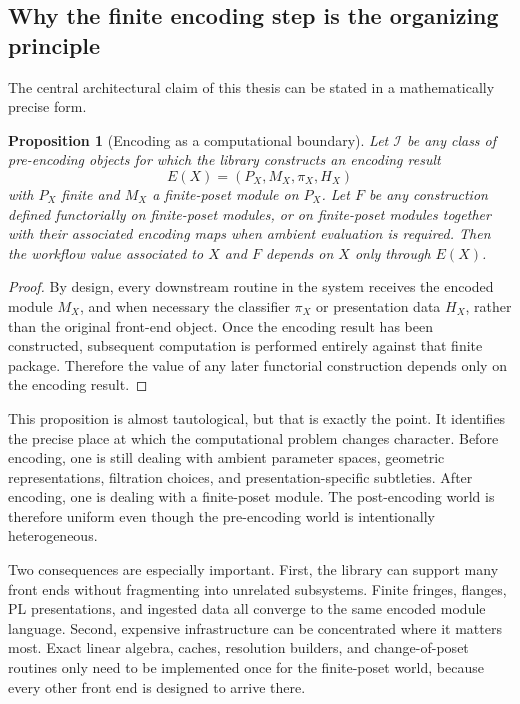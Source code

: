 \documentclass[11pt]{article}
\newtheorem{proposition}[theorem]{Proposition}
\theoremstyle{definition}
\theoremstyle{remark}
\begin{document}
\subsection{Why the finite encoding step is the organizing principle}

The central architectural claim of this thesis can be stated in a mathematically precise form.

\begin{proposition}[Encoding as a computational boundary]
Let $\mathcal{I}$ be any class of pre-encoding objects for which the library constructs an encoding result
\[
E(X)=(P_X,M_X,\pi_X,H_X)
\]
with $P_X$ finite and $M_X$ a finite-poset module on $P_X$.  Let $F$ be any construction defined functorially on finite-poset modules, or on finite-poset modules together with their associated encoding maps when ambient evaluation is required.  Then the workflow value associated to $X$ and $F$ depends on $X$ only through $E(X)$.
\end{proposition}

\begin{proof}
By design, every downstream routine in the system receives the encoded module $M_X$, and when necessary the classifier $\pi_X$ or presentation data $H_X$, rather than the original front-end object.  Once the encoding result has been constructed, subsequent computation is performed entirely against that finite package.  Therefore the value of any later functorial construction depends only on the encoding result.
\end{proof}

This proposition is almost tautological, but that is exactly the point.  It identifies the precise place at which the computational problem changes character.  Before encoding, one is still dealing with ambient parameter spaces, geometric representations, filtration choices, and presentation-specific subtleties.  After encoding, one is dealing with a finite-poset module.  The post-encoding world is therefore uniform even though the pre-encoding world is intentionally heterogeneous.

Two consequences are especially important.  First, the library can support many front ends without fragmenting into unrelated subsystems.  Finite fringes, flanges, PL presentations, and ingested data all converge to the same encoded module language.  Second, expensive infrastructure can be concentrated where it matters most.  Exact linear algebra, caches, resolution builders, and change-of-poset routines only need to be implemented once for the finite-poset world, because every other front end is designed to arrive there.
\end{document}
